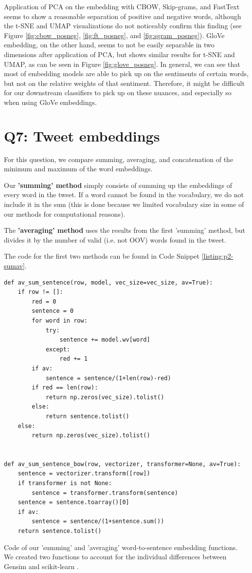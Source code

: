 Application of PCA on the embedding with CBOW, Skip-grams, and FastText seems to show a reasonable separation of positive and negative words, although the t-SNE and UMAP visualizations do not noticeably confirm this finding (see Figure \ref{fig:cbow_posneg}, \ref{fig:ft_posneg}, and \ref{fig:sgram_posneg}). GloVe embedding, on the other hand, seems to not be easily separable in two dimensions after application of PCA, but shows similar results for t-SNE and UMAP, as can be seen in Figure \ref{fig:glove_posneg}.
In general, we can see that most of embedding models are able to pick up on the sentiments of certain words, but not on the relative weights of that sentiment. Therefore, it might be difficult for our downstream classifiers to pick up on these nuances, and especially so when using GloVe embeddings.

\section*{Q7: Tweet embeddings}
For this question, we compare summing, averaging, and concatenation of the minimum and maximum of the word embeddings.

Our \textbf{'summing' method} simply consists of summing up the embeddings of every word in the tweet. If a word cannot be found in the vocabulary, we do not include it in the sum (this is done because we limited vocabulary size in some of our methods for computational reasons).

The \textbf{'averaging' method} uses the results from the first 'summing' method, but divides it by the number of valid (i.e. not OOV) words found in the tweet.

The code for the first two methods can be found in Code Snippet \ref{listing:p2-sumav}.

\begin{listing*}
\begin{verbatim}
def av_sum_sentence(row, model, vec_size=vec_size, av=True):
    if row != []:
        red = 0
        sentence = 0
        for word in row:
            try:
                sentence += model.wv[word]
            except:
                red += 1
        if av:
            sentence = sentence/(1+len(row)-red)
        if red == len(row):
            return np.zeros(vec_size).tolist()
        else:
            return sentence.tolist()
    else:
        return np.zeros(vec_size).tolist()


def av_sum_sentence_bow(row, vectorizer, transformer=None, av=True):
    sentence = vectorizer.transform([row])
    if transformer is not None:
        sentence = transformer.transform(sentence)
    sentence = sentence.toarray()[0]
    if av:
        sentence = sentence/(1+sentence.sum())
    return sentence.tolist()
\end{verbatim}
\caption{Code of our 'summing' and 'averaging' word-to-sentence embedding functions. We created two functions to account for the individual differences between Gensim \cite{gensim} and scikit-learn \cite{sklearn1, sklearn2}.}
\label{listing:p2-sumav}
\end{listing*}


